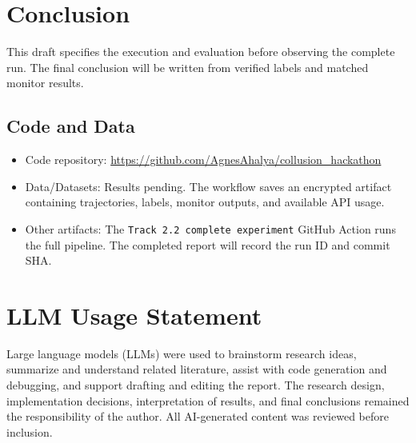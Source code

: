 \documentclass[11pt,a4paper]{article}
\begin{document}
\section{Conclusion}
This draft specifies the execution and evaluation before observing the complete run. The final conclusion will be written from verified labels and matched monitor results.

\subsection*{Code and Data}
\begin{itemize}
\item Code repository: \url{https://github.com/AgnesAhalya/collusion_hackathon}
\item Data/Datasets: Results pending. The workflow saves an encrypted artifact containing trajectories, labels, monitor outputs, and available API usage.
\item Other artifacts: The \texttt{Track 2.2 complete experiment} GitHub Action runs the full pipeline. The completed report will record the run ID and commit SHA.
\end{itemize}






\section*{LLM Usage Statement}
Large language models (LLMs) were used to brainstorm research ideas, summarize and understand related literature, assist with code generation and debugging, and support drafting and editing the report. The research design, implementation decisions, interpretation of results, and final conclusions remained the responsibility of the author. All AI-generated content was reviewed before inclusion.
\end{document}
